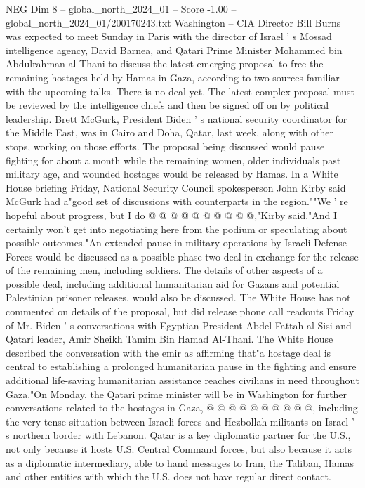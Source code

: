 \begin{textsample}{NEG Dim 8 – global\_north\_2024\_01 – Score -1.00 – global\_north\_2024\_01/200170243.txt}  \label{ex:f8_neg_209}
Washington -- CIA Director Bill Burns was expected to meet Sunday in Paris with the director of Israel ' s Mossad intelligence agency, David Barnea, and Qatari Prime Minister Mohammed bin Abdulrahman al Thani to discuss the latest emerging proposal to free the remaining hostages held by Hamas in Gaza, according to two sources familiar with the upcoming talks.
There is no deal yet.
The latest complex proposal must be reviewed by the intelligence chiefs and then be signed off on by political leadership.
Brett McGurk, President Biden ' s national security coordinator for the Middle East, was in Cairo and Doha, Qatar, last week, along with other stops, working on those efforts.
The proposal being discussed would pause fighting for about a month while the remaining women, older individuals past military age, and wounded hostages would be released by Hamas.
In a White House briefing Friday, National Security Council spokesperson John Kirby said McGurk had a"good set of discussions with counterparts in the region.""We ' re hopeful about progress, but I do @ @ @ @ @ @ @ @ @ @,"Kirby said."And I certainly won't get into negotiating here from the podium or speculating about possible outcomes."An extended pause in military operations by Israeli Defense Forces would be discussed as a possible phase-two deal in exchange for the release of the remaining men, including soldiers.
The details of other aspects of a possible deal, including additional humanitarian aid for Gazans and potential Palestinian prisoner releases, would also be discussed.
The White House has not commented on details of the proposal, but did release phone call readouts Friday of Mr.
Biden ' s conversations with Egyptian President Abdel Fattah al-Sisi and Qatari leader, Amir Sheikh Tamim Bin Hamad Al-Thani.
The White House described the conversation with the emir as affirming that"a hostage deal is central to establishing a prolonged humanitarian pause in the fighting and ensure additional life-saving humanitarian assistance reaches civilians in need throughout Gaza."On Monday, the Qatari prime minister will be in Washington for further conversations related to the hostages in Gaza, @ @ @ @ @ @ @ @ @ @, including the very tense situation between Israeli forces and Hezbollah militants on Israel ' s northern border with Lebanon.
Qatar is a key diplomatic partner for the U.S., not only because it hosts U.S.
Central Command forces, but also because it acts as a diplomatic intermediary, able to hand messages to Iran, the Taliban, Hamas and other entities with which the U.S. does not have regular direct contact.

\end{textsample}
